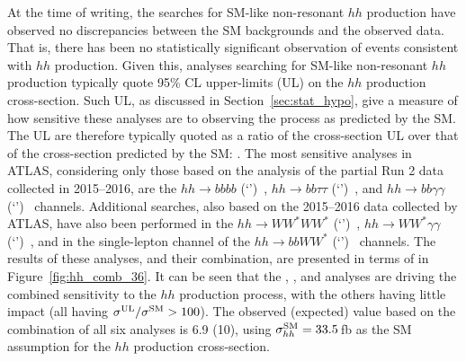 At the time of writing, the searches for SM-like non-resonant $hh$ production have observed no discrepancies
between the SM backgrounds and the observed data.
That is, there has been no statistically significant observation of events consistent with $hh$ production.
Given this, analyses searching for SM-like non-resonant $hh$ production typically quote 95\% CL
upper-limits (UL) on the $hh$ production cross-section.
Such UL, as discussed in Section~\ref{sec:stat_hypo}, give a measure of how sensitive these analyses
are to observing the process as predicted by the SM.
The UL are therefore typically quoted as a ratio of the cross-section UL over that of the cross-section
predicted by the SM: \sigmaRatio.
The most sensitive analyses in ATLAS, considering only those based on the analysis of the partial Run 2 data collected in 2015--2016,
are the $hh \rightarrow bbbb$ (`\bbbb')~\cite{HHBBBB}, $hh \rightarrow bb\tau\tau$ (`\bbtautau')~\cite{HHBBTAUTAU},
and $hh \rightarrow bb\gamma\gamma$ (`\bbyy')~\cite{HHBBGAMGAM} channels.
Additional searches, also based on the 2015--2016 data collected by ATLAS, have also been performed
in the $hh \rightarrow WW^*WW^*$ (`\wwww')~\cite{HHWWWW}, $hh \rightarrow WW^* \gamma \gamma$ (`\wwyy')~\cite{HHWWGAMGAM},
and in the single-lepton channel of the $hh \rightarrow bbWW^*$ (`\bbww')~\cite{HHBBWW} channels.
The results of these analyses, and their combination, are presented in terms of \sigmaRatio in Figure~\ref{fig:hh_comb_36}.
It can be seen that the \bbbb, \bbtautau, and \bbyy analyses are driving the combined sensitivity
to the $hh$ production process, with the others having little impact (all having $\sigma^{\text{UL}} / \sigma^{\text{SM}} >100$).
The observed (expected) \sigmaRatio value based on the combination of all six analyses is 6.9 (10), using
$\sigma_{hh}^{\text{SM}} = 33.5$\,fb as the SM assumption for the $hh$ production cross-section.


